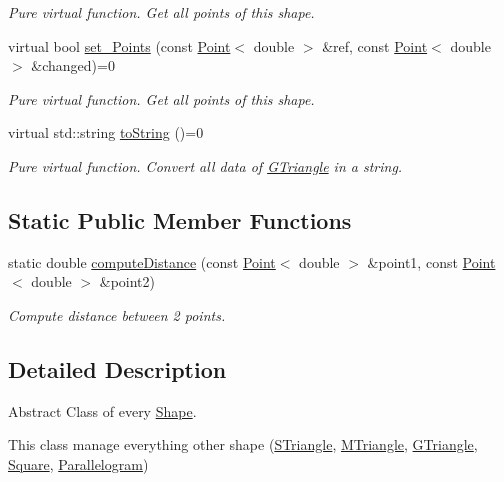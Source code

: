 \begin{DoxyCompactItemize}
\begin{DoxyCompactList}\small\item\em Pure virtual function. Get all points of this shape. \end{DoxyCompactList}\item 
virtual bool \hyperlink{classShape_a6eb0d80cccc44cb72b06c61d9780bc6b}{set\+\_\+\+Points} (const \hyperlink{classPoint}{Point}$<$ double $>$ \&ref, const \hyperlink{classPoint}{Point}$<$ double $>$ \&changed)=0
\begin{DoxyCompactList}\small\item\em Pure virtual function. Get all points of this shape. \end{DoxyCompactList}\item 
virtual std\+::string \hyperlink{classShape_a98fa87c6dc4c7045fd6897a8f3bc186c}{to\+String} ()=0
\begin{DoxyCompactList}\small\item\em Pure virtual function. Convert all data of \hyperlink{classGTriangle}{G\+Triangle} in a string. \end{DoxyCompactList}\end{DoxyCompactItemize}
\subsection*{Static Public Member Functions}
\begin{DoxyCompactItemize}
\item 
static double \hyperlink{classShape_aadd5fcb0535a62f4ed4dcfb39e86336a}{compute\+Distance} (const \hyperlink{classPoint}{Point}$<$ double $>$ \&point1, const \hyperlink{classPoint}{Point}$<$ double $>$ \&point2)
\begin{DoxyCompactList}\small\item\em Compute distance between 2 points. \end{DoxyCompactList}\end{DoxyCompactItemize}


\subsection{Detailed Description}
Abstract Class of every \hyperlink{classShape}{Shape}. 

This class manage everything other shape (\hyperlink{classSTriangle}{S\+Triangle}, \hyperlink{classMTriangle}{M\+Triangle}, \hyperlink{classGTriangle}{G\+Triangle}, \hyperlink{classSquare}{Square}, \hyperlink{classParallelogram}{Parallelogram}) 

